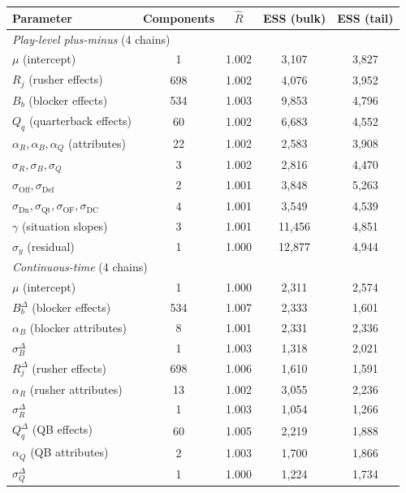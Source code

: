 \begin{table}[h!]
\centering
\footnotesize
\begin{tabular}{lcccc}
\toprule
Parameter & Components & $\widehat{R}$ & ESS (bulk) & ESS (tail) \\
\midrule
\multicolumn{5}{l}{\emph{Play-level plus-minus} (4 chains)} \\
\midrule
$\mu$ (intercept) & 1 & 1.002 & 3,107 & 3,827 \\
$R_j$ (rusher effects) & 698 & 1.002 & 4,076 & 3,952 \\
$B_b$ (blocker effects) & 534 & 1.003 & 9,853 & 4,796 \\
$Q_q$ (quarterback effects) & 60 & 1.002 & 6,683 & 4,552 \\
$\alpha_R,\alpha_B,\alpha_Q$ (attributes) & 22 & 1.002 & 2,583 & 3,908 \\
$\sigma_R,\sigma_B,\sigma_Q$ & 3 & 1.002 & 2,816 & 4,470 \\
$\sigma_{\mathrm{Off}},\sigma_{\mathrm{Def}}$ & 2 & 1.001 & 3,848 & 5,263 \\
$\sigma_{\mathrm{Dn}},\sigma_{\mathrm{Qt}},\sigma_{\mathrm{OF}},\sigma_{\mathrm{DC}}$ & 4 & 1.001 & 3,549 & 4,539 \\
$\gamma$ (situation slopes) & 3 & 1.001 & 11,456 & 4,851 \\
$\sigma_y$ (residual) & 1 & 1.000 & 12,877 & 4,944 \\
\midrule
\multicolumn{5}{l}{\emph{Continuous-time} (4 chains)} \\
\midrule
$\mu$ (intercept) & 1 & 1.000 & 2,311 & 2,574 \\
$B^{\Delta}_b$ (blocker effects) & 534 & 1.007 & 2,333 & 1,601 \\
$\alpha_B$ (blocker attributes) & 8 & 1.001 & 2,331 & 2,336 \\
$\sigma_B^{\Delta}$ & 1 & 1.003 & 1,318 & 2,021 \\
$R^{\Delta}_j$ (rusher effects) & 698 & 1.006 & 1,610 & 1,591 \\
$\alpha_R$ (rusher attributes) & 13 & 1.002 & 3,055 & 2,236 \\
$\sigma_R^{\Delta}$ & 1 & 1.003 & 1,054 & 1,266 \\
$Q^{\Delta}_q$ (QB effects) & 60 & 1.005 & 2,219 & 1,888 \\
$\alpha_Q$ (QB attributes) & 2 & 1.003 & 1,700 & 1,866 \\
$\sigma_Q^{\Delta}$ & 1 & 1.000 & 1,224 & 1,734 \\

\end{tabular}
\end{table}
